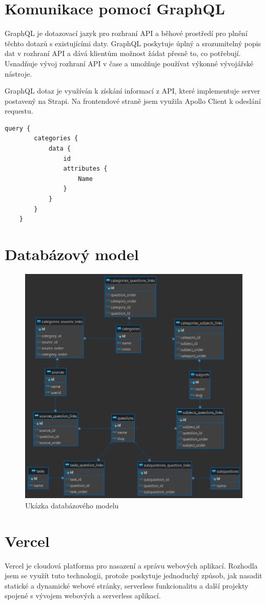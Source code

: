 \documentclass[12pt, a4paper,
oneside,      %
openright
]{report}
\begin{document}
\section{Komunikace pomocí GraphQL}
GraphQL je dotazovací jazyk pro rozhraní API a běhové prostředí pro plnění těchto dotazů s existujícími daty. GraphQL poskytuje úplný a srozumitelný popis dat v rozhraní API a dává klientům možnost žádat přesně to, co potřebují. Usnadňuje vývoj rozhraní API v čase a umožňuje používat výkonné vývojářské nástroje.

GraphQL dotaz je využíván k získání informací z API, které implementuje server postavený na Strapi. Na frontendové straně jsem využila Apollo Client k odeslání requestu.

\newpage
\begin{lstlisting}[style=JavaScript, title={Kód}, caption={Ukázka query v Content.js}] 
	query {
		categories {
			data {
				id
				attributes {
					Name
				}
			}
		}
	}
\end{lstlisting}

\section{Databázový model}

\begin{figure}[h]
	\centering
	\includegraphics[width=0.7\linewidth]{image/scheme.png} 
	\caption{Ukázka databázového modelu}
\end{figure}

\section{Vercel}
Vercel je cloudová platforma pro nasazení a správu webových aplikací. Rozhodla jsem se využít tuto technologii, protože poskytuje jednoduchý způsob, jak nasadit statické a dynamické webové stránky, serverless funkcionalitu a další projekty spojené s vývojem webových a serverless aplikací.
\end{document}
